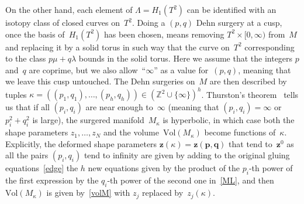 \documentclass[12pt,reqno]{amsart}
\theoremstyle{definition}
\def\Vol{\mathrm{Vol}}
\def\k{\kappa}
\newcommand{\mb}{\mathbf}
\def\C{\mathbb C}
\def\Z{\mathbb Z}
\def\bp{\mb p}  \def\bq{\mb q}  \def\bz{\mb z} \def\bw{\mb w}
\def\l{\lambda}
\def\L{\Lambda}
\begin{document}
On the other hand, each element of $\L=H_1(T^2)$ can be identified with an isotopy class of
closed curves on~$T^2$. Doing a $(p,q)$ Dehn surgery at a cusp, once the basis of~$H_1(T^2)$ 
has been chosen, means removing $T^2\times[0,\infty)$ from~$M$ and replacing it by a solid 
torus in such way that the curve on~$T^2$ corresponding to the class $p\mu+q\l$ bounds 
in the solid torus. Here we assume that the integers $p$ and~$q$ are coprime, but we also 
allow~``$\infty$'' as a value for~$(p,q)$, meaning that we leave this cusp untouched.  The 
Dehn surgeries on~$M$ are then described by tuples 
$\k=((p_1,q_1),\dots,(p_h,q_h))\in(\Z^2\cup\{\infty\})^h$.  Thurston's theorem~\cite{Thurston}
tells us that if all $(p_i,q_i)$ are near enough to~$\infty$ (meaning that $(p_i,q_i)=\infty$ or 
$p_i^2+q_i^2$ is large), the surgered manifold~$M_\k$ is hyperbolic, in which case 
both the shape parameters $z_1,\dots,z_N$ and the volume~$\Vol(M_\k)$ become functions 
of~$\k$.  Explicitly, the deformed shape parameters 
$\bz(\k)=\bz(\bp,\bq)$ that tend to~$\bz^0$ as all the pairs $(p_i,q_i)$ tend to infinity 
are given by adding to the original gluing equations~\eqref{edge} the $h$ new equations given
by the product of the $p_i$-th power of the first expression by the $q_i$-th power of the 
second one in~\eqref{ML}, and then $\Vol(M_\k)$ is given by~\eqref{volM} with $z_j$
replaced by~$z_j(\k)$.
\end{document}

